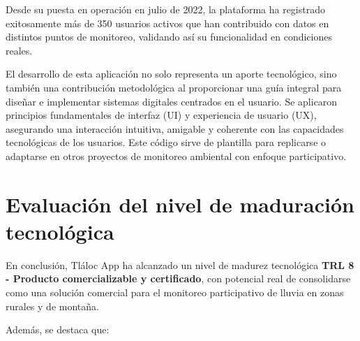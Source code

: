 Desde su puesta en operación en julio de 2022, la plataforma ha registrado exitosamente más de 350 usuarios activos que han contribuido con datos en distintos puntos de monitoreo, validando así su funcionalidad en condiciones reales. 

El desarrollo de esta aplicación no solo representa un aporte tecnológico, sino también una contribución metodológica al proporcionar una guía integral para diseñar e implementar sistemas digitales centrados en el usuario. Se aplicaron principios fundamentales de interfaz (UI) y experiencia de usuario (UX), asegurando una interacción intuitiva, amigable y coherente con las capacidades tecnológicas de los usuarios. Este código sirve de plantilla para replicarse o adaptarse en otros proyectos de monitoreo ambiental con enfoque participativo.


\section{Evaluación del nivel de maduración tecnológica}

En conclusión, Tláloc App ha alcanzado un nivel de madurez tecnológica \textbf{TRL 8 - Producto comercializable y certificado}, con potencial real de consolidarse como una solución comercial para el monitoreo participativo de lluvia en zonas rurales y de montaña.

Además, se destaca que:

